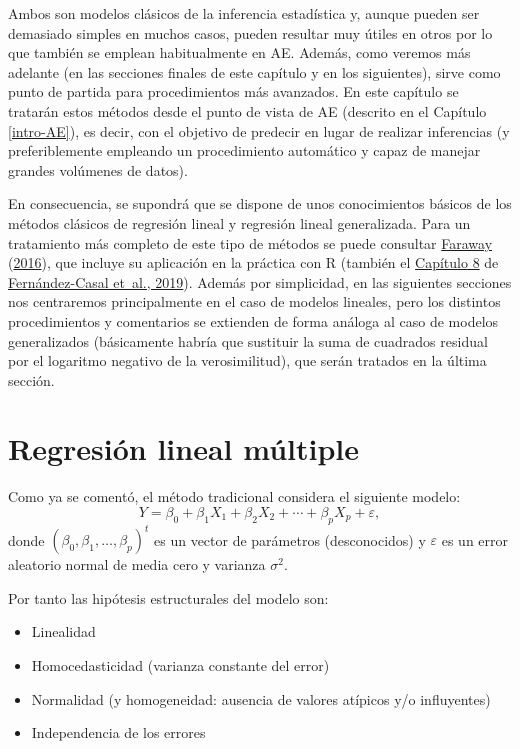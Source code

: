 \documentclass[
  spanish,
]{book}
\theoremstyle{break}
\theoremstyle{definition}
\theoremstyle{definition}
\theoremstyle{definition}
\theoremstyle{definition}
\theoremstyle{remark}
\begin{document}
Ambos son modelos clásicos de la inferencia estadística y, aunque pueden ser demasiado simples en muchos casos, pueden resultar muy útiles en otros por lo que también se emplean habitualmente en AE.
Además, como veremos más adelante (en las secciones finales de este capítulo y en los siguientes), sirve como punto de partida para procedimientos más avanzados.
En este capítulo se tratarán estos métodos desde el punto de vista de AE (descrito en el Capítulo \ref{intro-AE}), es decir, con el objetivo de predecir en lugar de realizar inferencias (y preferiblemente empleando un procedimiento automático y capaz de manejar grandes volúmenes de datos).

En consecuencia, se supondrá que se dispone de unos conocimientos básicos de los métodos clásicos de regresión lineal y regresión lineal generalizada.
Para un tratamiento más completo de este tipo de métodos se puede consultar \protect\hyperlink{ref-faraway2014linear}{Faraway} (\protect\hyperlink{ref-faraway2014linear}{2016}), que incluye su aplicación en la práctica con R (también el \href{https://rubenfcasal.github.io/intror/modelos-lineales.html}{Capítulo 8} de \protect\hyperlink{ref-fernandez2019intror}{Fernández-Casal et~al., 2019}).
Además por simplicidad, en las siguientes secciones nos centraremos principalmente en el caso de modelos lineales, pero los distintos procedimientos y comentarios se extienden de forma análoga al caso de modelos generalizados (básicamente habría que sustituir la suma de cuadrados residual por el logaritmo negativo de la verosimilitud), que serán tratados en la última sección.

\hypertarget{reg-multiple}{%
\section{Regresión lineal múltiple}\label{reg-multiple}}

Como ya se comentó, el método tradicional considera el siguiente modelo:
\begin{equation} 
  Y = \beta_{0}+\beta_{1}X_{1}+\beta_{2}X_{2}+\cdots+\beta_{p}X_{p} + \varepsilon,
  \label{eq:modelo-rlm}
\end{equation}
donde \(\left( \beta_{0},\beta_{1},\ldots,\beta_{p}\right)^t\) es un vector de parámetros (desconocidos) y \(\varepsilon\) es un error aleatorio normal de media cero y varianza \(\sigma^2\).

Por tanto las hipótesis estructurales del modelo son:

\begin{itemize}
\item
  Linealidad
\item
  Homocedasticidad (varianza constante del error)
\item
  Normalidad (y homogeneidad: ausencia de valores atípicos y/o influyentes)
\item
  Independencia de los errores
\end{itemize}
\end{document}
